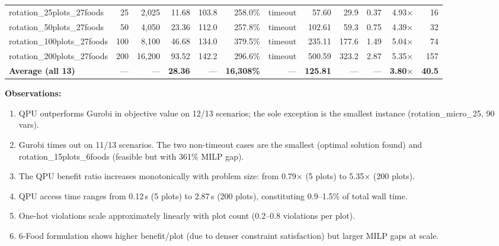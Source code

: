\documentclass{oqireport}
\begin{document}
\begin{table}[H]
\begin{adjustbox}{max width=\textwidth}
\begin{tabular}{l r r r r r r r r r r r}
\midrule
rotation\_25plots\_27foods & 25 & 2,025 & 11.68 & 103.8 & 258.0\% & timeout & 57.60 & 29.9 & 0.37 & 4.93$\times$ & 16 \\
rotation\_50plots\_27foods & 50 & 4,050 & 23.36 & 112.0 & 257.8\% & timeout & 102.61 & 59.3 & 0.75 & 4.39$\times$ & 32 \\
rotation\_100plots\_27foods & 100 & 8,100 & 46.68 & 134.0 & 379.5\% & timeout & 235.11 & 177.6 & 1.49 & 5.04$\times$ & 74 \\
rotation\_200plots\_27foods & 200 & 16,200 & 93.52 & 142.2 & 296.6\% & timeout & 500.59 & 323.2 & 2.87 & 5.35$\times$ & 157 \\
\midrule
\textbf{Average (all 13)} & --- & --- & \textbf{28.36} & --- & \textbf{16,308\%} & --- & \textbf{125.81} & --- & --- & \textbf{3.80$\times$} & \textbf{40.5} \\
\bottomrule
\end{tabular}
\end{adjustbox}
\end{table}

\noindent\textbf{Observations:}
\begin{enumerate}[label=(\arabic*)]
\item QPU outperforms Gurobi in objective value on 12/13 scenarios; the sole exception is the smallest instance (rotation\_micro\_25, 90 vars).
\item Gurobi times out on 11/13 scenarios. The two non-timeout cases are the smallest (optimal solution found) and rotation\_15plots\_6foods (feasible but with 361\% MILP gap).
\item The QPU benefit ratio increases monotonically with problem size: from 0.79$\times$ (5 plots) to 5.35$\times$ (200 plots).
\item QPU access time ranges from 0.12\,s (5 plots) to 2.87\,s (200 plots), constituting 0.9--1.5\% of total wall time.
\item One-hot violations scale approximately linearly with plot count (0.2--0.8 violations per plot).
\item 6-Food formulation shows higher benefit/plot (due to denser constraint satisfaction) but larger MILP gaps at scale.
\end{enumerate}


\end{document}
